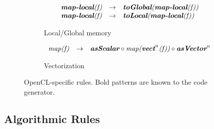 \begin{figure}[t]
\vspace{\ruleSpace}
\begin{subfigure}[b]{1\linewidth}
\begin{mdframed}
\vspace{.2em}
$$
\begin{array}{lrl}
  \textit{\textbf{map-local}(f)} & \rightarrow & \textit{\textbf{toGlobal}(\textbf{map-local}(f))}\\  
  \textit{\textbf{map-local}(f)} & \rightarrow & \textit{\textbf{toLocal}(\textbf{map-local}(f))}\\  
\end{array}
$$
\end{mdframed}
  \caption{Local/Global memory}
  \label{fig:low:mem}
\end{subfigure}

\vspace{\ruleSpace}
\begin{subfigure}[b]{1\linewidth}
\begin{mdframed}
\vspace{-.75em}
$$
\begin{array}{lrll}
\textit{map(f)} & \rightarrow & \textit{\textbf{asScalar}} \circ \textit{map(\textbf{vect}}^n\textit{(f))} \circ \textit{\textbf{asVector}}^n
\end{array}
$$
\end{mdframed}
  \caption{Vectorization}
   \label{fig:algo:vect}
\end{subfigure}

\vspace{-2em}
\caption{OpenCL-specific rules. Bold patterns are known to the code generator.}
\label{fig:lowRules}
\end{figure}




\subsection{Algorithmic Rules}

\newcommand{\Reduce}{\text{\textit{reduce}}\xspace}
\newcommand{\PartRed}{\text{\textit{part-red}}\xspace}
\newcommand{\RedSeq}{\text{\textit{reduce-seq}}\xspace}
\newcommand{\Map}{\text{\textit{map}}\xspace}
\newcommand{\MapSeq}{\text{\textit{map-seq}}\xspace}
\newcommand{\MyJoin}{\text{\textit{join}}\xspace}
\newcommand{\MySplit}[1]{\text{\textit{split}}^{#1}\xspace}


